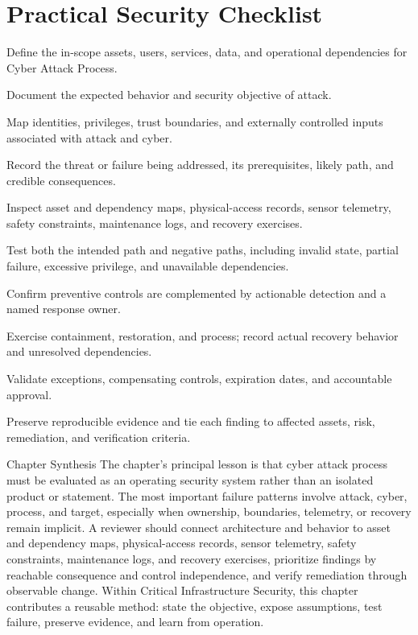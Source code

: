\documentclass[11pt,letterpaper]{article}
\begin{document}
\section*{Practical Security Checklist}
\begin{CornellChecklist}
\item Define the in-scope assets, users, services, data, and operational dependencies for Cyber Attack Process.
\item Document the expected behavior and security objective of attack.
\item Map identities, privileges, trust boundaries, and externally controlled inputs associated with attack and cyber.
\item Record the threat or failure being addressed, its prerequisites, likely path, and credible consequences.
\item Inspect asset and dependency maps, physical-access records, sensor telemetry, safety constraints, maintenance logs, and recovery exercises.
\item Test both the intended path and negative paths, including invalid state, partial failure, excessive privilege, and unavailable dependencies.
\item Confirm preventive controls are complemented by actionable detection and a named response owner.
\item Exercise containment, restoration, and process; record actual recovery behavior and unresolved dependencies.
\item Validate exceptions, compensating controls, expiration dates, and accountable approval.
\item Preserve reproducible evidence and tie each finding to affected assets, risk, remediation, and verification criteria.
\end{CornellChecklist}
\begin{CornellSummaryBox}{Chapter Synthesis}
The chapter's principal lesson is that cyber attack process must be evaluated as an operating security system rather than an isolated product or statement. The most important failure patterns involve attack, cyber, process, and target, especially when ownership, boundaries, telemetry, or recovery remain implicit. A reviewer should connect architecture and behavior to asset and dependency maps, physical-access records, sensor telemetry, safety constraints, maintenance logs, and recovery exercises, prioritize findings by reachable consequence and control independence, and verify remediation through observable change. Within Critical Infrastructure Security, this chapter contributes a reusable method: state the objective, expose assumptions, test failure, preserve evidence, and learn from operation.
\end{CornellSummaryBox}
\end{document}
